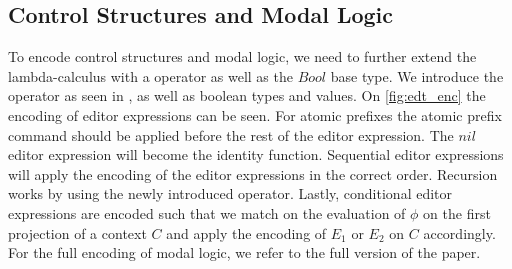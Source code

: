 \documentclass[sigplan,anonymous,review]{acmart}
\begin{document}
\subsection{Control Structures and Modal Logic}
To encode control structures and modal logic, we need to further extend the lambda-calculus with a \fix operator as well as the $Bool$ base type. We introduce the \fix operator as seen in \cite{types_programming_languages}, as well as boolean types and values. 
On \cref{fig:edt_enc} the encoding of editor expressions can be seen. For atomic prefixes the atomic prefix command should be applied before the rest of the editor expression. The $nil$ editor expression will become the identity function. Sequential editor expressions will apply the encoding of the editor expressions in the correct order. Recursion works by using the newly introduced \fix operator. Lastly, conditional editor expressions are encoded such that we match on the evaluation of $\phi$ on the first projection of a context $C$ and apply the encoding of $E_1$ or $E_2$ on $C$ accordingly. For the full encoding of modal logic, we refer to the full version of the paper.


\end{document}
